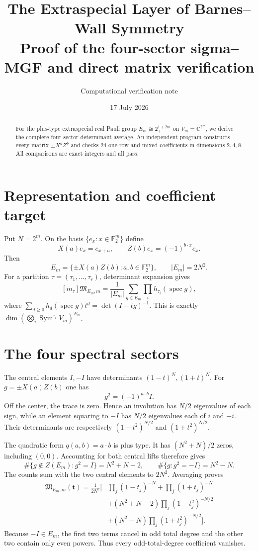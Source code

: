 \documentclass[11pt]{article}
\title{\color{navy}\bfseries The Extraspecial Layer of Barnes--Wall Symmetry\\
\large Proof of the four-sector sigma--MGF and direct matrix verification}
\author{Computational verification note}\date{17 July 2026}
\newcommand{\MGF}{\mathfrak M}
\begin{document}
\maketitle

\begin{abstract}
For the plus-type extraspecial real Pauli group
$E_m\cong 2_+^{1+2m}$ on $V_m=\mathbb C^{2^m}$, we derive the complete
four-sector determinant average.  An independent program constructs every
matrix $\pm X^aZ^b$ and checks 24 one-row and mixed coefficients in
dimensions $2,4,8$.  All comparisons are exact integers and all pass.
\end{abstract}

\section{Representation and coefficient target}
Put $N=2^m$.  On the basis $\{e_x:x\in\mathbb F_2^m\}$ define
\[
 X(a)e_x=e_{x+a},\qquad Z(b)e_x=(-1)^{b\cdot x}e_x.
\]
Then
\[
 E_m=\{\pm X(a)Z(b):a,b\in\mathbb F_2^m\},\qquad |E_m|=2N^2.
\]
For a partition $\tau=(\tau_1,\ldots,\tau_r)$, determinant expansion gives
\begin{equation}\label{eq:target}
 [m_\tau]\MGF_{E_m,m}
 =\frac1{|E_m|}\sum_{g\in E_m}\prod_i
 h_{\tau_i}(\operatorname{spec}g),
\end{equation}
where $\sum_{d\geq0}h_d(\operatorname{spec}g)t^d=
\det(I-tg)^{-1}$.  This is exactly
$\dim(\bigotimes_i\operatorname{Sym}^{\tau_i}V_m)^{E_m}$.

\section{The four spectral sectors}
The central elements $I,-I$ have determinants $(1-t)^N,(1+t)^N$.
For $g=\pm X(a)Z(b)$ one has
\[
 g^2=(-1)^{a\cdot b}I.
\]
Off the center, the trace is zero.  Hence an involution has $N/2$ eigenvalues
of each sign, while an element squaring to $-I$ has $N/2$ eigenvalues each
of $i$ and $-i$.  Their determinants are respectively
$(1-t^2)^{N/2}$ and $(1+t^2)^{N/2}$.

The quadratic form $q(a,b)=a\cdot b$ is plus type.  It has
$(N^2+N)/2$ zeros, including $(0,0)$.  Accounting for both central lifts
therefore gives
\[
 \#\{g\notin Z(E_m):g^2=I\}=N^2+N-2,
 \qquad \#\{g:g^2=-I\}=N^2-N.
\]
The counts sum with the two central elements to $2N^2$.  Averaging proves
\begin{equation}\label{eq:formula}
\boxed{\begin{aligned}
\MGF_{E_m,m}(\mathbf t)=\frac1{2N^2}\Big[&
\prod_j(1-t_j)^{-N}+\prod_j(1+t_j)^{-N}\\
&+(N^2+N-2)\prod_j(1-t_j^2)^{-N/2}\\
&+(N^2-N)\prod_j(1+t_j^2)^{-N/2}\Big].
\end{aligned}}
\end{equation}
Because $-I\in E_m$, the first two terms cancel in odd total degree and the
other two contain only even powers.  Thus every odd-total-degree coefficient
vanishes.
\end{document}
